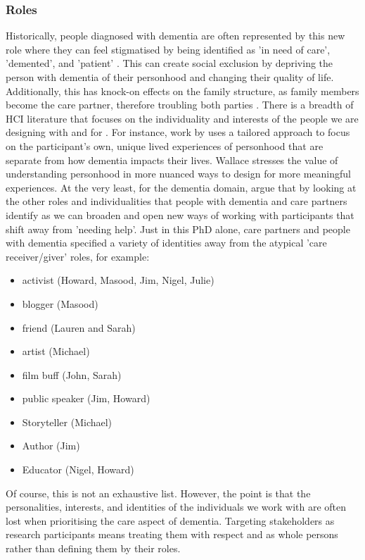 \subsubsection{Roles}
\label{Roles}
Historically, people diagnosed with dementia are often represented by this new role where they can feel stigmatised by being identified as 'in need of care', 'demented', and 'patient' \citep{benbow_dementia_2012}. This can create social exclusion by depriving the person with dementia of their personhood and changing their quality of life. Additionally, this has knock-on effects on the family structure, as family members become the care partner, therefore troubling both parties \citep{lee_technology-based_2015}. There is a breadth of HCI literature that focuses on the individuality and interests of the people we are designing with and for \citep{lazar_rethinking_2016,brankaert_intersections_2019,foley_printer_2019,mcnaney_demyouth:_2017}. For instance, work by \cite{wallace_design-led_2013} uses a tailored approach to focus on the participant's own, unique lived experiences of personhood that are separate from how dementia impacts their lives. Wallace stresses the value of understanding personhood in more nuanced ways to design for more meaningful experiences. At the very least, for the dementia domain, \cite{bartlett2010broadening} argue that by looking at the other roles and individualities that people with dementia and care partners identify as we can broaden and open new ways of working with participants that shift away from 'needing help'. Just in this PhD alone, care partners and people with dementia specified a variety of identities away from the atypical 'care receiver/giver' roles, for example:
\begin{itemize}
\item	activist (Howard, Masood, Jim, Nigel, Julie)
\item	blogger (Masood)
\item	friend (Lauren and Sarah)
\item	artist (Michael)
\item	film buff (John, Sarah)
\item	public speaker (Jim, Howard)
\item	Storyteller (Michael)
\item	Author (Jim)
\item	Educator (Nigel, Howard)
\end{itemize}
Of course, this is not an exhaustive list. However, the point is that the personalities, interests, and identities of the individuals we work with are often lost when prioritising the care aspect of dementia. Targeting stakeholders as research participants means treating them with respect and as whole persons rather than defining them by their roles. 

